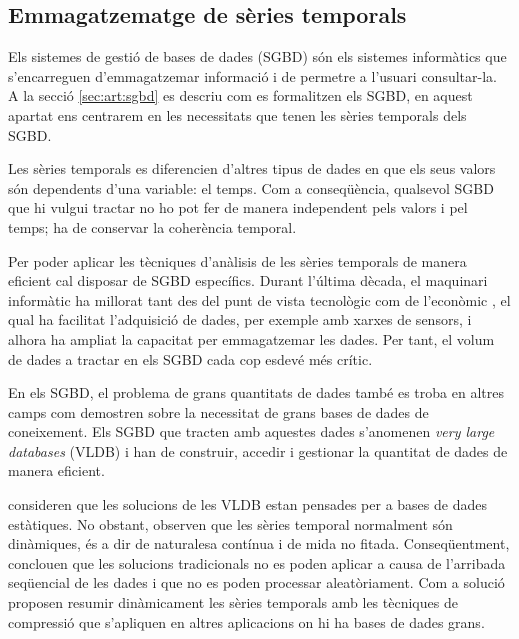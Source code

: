 \subsection{Emmagatzematge de sèries temporals}


Els sistemes de gestió de bases de dades (SGBD) són els sistemes informàtics que s'encarreguen d'emmagatzemar informació i de permetre a l'usuari consultar-la. A la secció \ref{sec:art:sgbd} es descriu com es formalitzen els SGBD, en aquest apartat ens centrarem en les necessitats que tenen les sèries temporals dels SGBD.


Les sèries temporals es diferencien d'altres tipus de dades en que els seus valors són dependents d'una variable: el temps. Com a conseqüència, qualsevol SGBD que hi vulgui tractar no ho pot fer de manera independent pels valors i pel temps; ha de conservar la coherència temporal.

Per poder aplicar les tècniques d'anàlisis de les sèries temporals de manera eficient cal disposar de SGBD específics. 
Durant l'última dècada, el maquinari informàtic ha millorat tant des del punt de vista tecnològic com de l'econòmic \parencite{deligiannakis07}, el qual ha facilitat l'adquisició de dades, per exemple amb xarxes de sensors, i alhora ha ampliat la capacitat per emmagatzemar les dades. 
Per tant, el volum de dades a tractar  en els SGBD cada cop esdevé més crític.

 
En els SGBD, el problema de grans quantitats de dades també es troba en altres camps com demostren \textcite{mylopoulos96} sobre la necessitat de grans bases de dades de coneixement. Els SGBD que tracten amb aquestes dades s'anomenen \emph{very large databases} (VLDB) i han de construir, accedir i gestionar la quantitat de dades de manera eficient.

\textcite{ogras06}  consideren que les solucions de les VLDB estan pensades per a bases de dades estàtiques. No obstant, observen que les sèries temporal normalment són dinàmiques, és a dir de naturalesa contínua i de mida no fitada. Conseqüentment, conclouen que les solucions tradicionals no es poden aplicar a causa de l'arribada seqüencial de les dades i que no es poden processar aleatòriament. 
Com a solució proposen resumir dinàmicament les sèries temporals amb les tècniques de compressió que s'apliquen en altres aplicacions on hi ha bases de dades grans.


